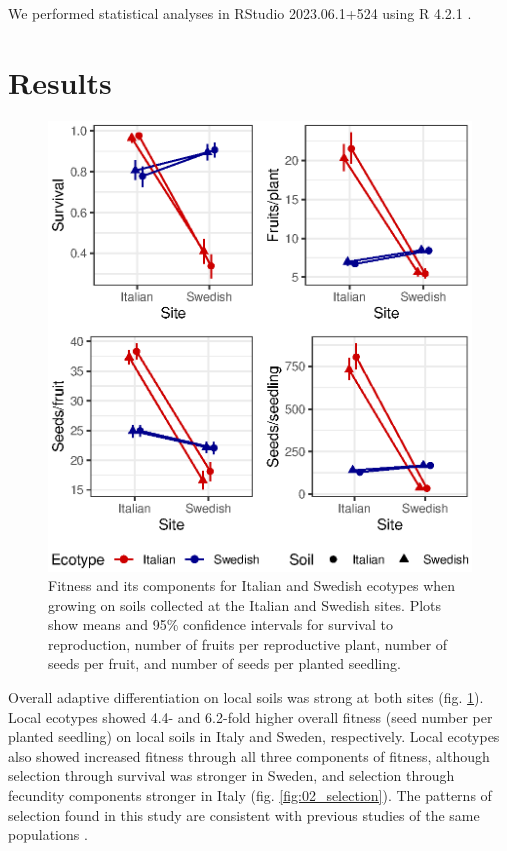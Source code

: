 \documentclass[twocolumn,twoside,lettersize]{article}
\begin{document}
We performed statistical analyses in RStudio 2023.06.1+524 using R 4.2.1 \cite{R_Core_Team2022-kg, posit-Team2023}.

\section*{Results}

\begin{figure}[]
  \begin{center}
      \includegraphics[]{figure1.eps}
      \caption{
          Fitness and its components for Italian and Swedish ecotypes when growing on soils collected at the Italian and Swedish sites. Plots show means and 95\% confidence intervals for survival to reproduction, number of fruits per reproductive plant, number of seeds per fruit, and number of seeds per planted seedling.
      }
      \label{fig:01_fitness}
  \end{center}
\end{figure}

Overall adaptive differentiation on local soils was strong at both sites (fig. \ref{fig:01_fitness}). Local ecotypes showed 4.4- and 6.2-fold higher overall fitness (seed number per planted seedling) on local soils in Italy and Sweden, respectively. Local ecotypes also showed increased fitness through all three components of fitness, although selection through survival was stronger in Sweden, and selection through fecundity components stronger in Italy (fig. \ref{fig:02_selection}). The patterns of selection found in this study are consistent with previous studies of the same populations \cite{Agren2012-ga, Agren2013-ph}.
\end{document}
